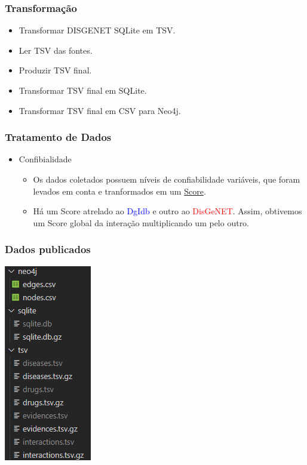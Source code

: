 \documentclass[12pt]{beamer}
\begin{document}
\begin{frame}[fragile]
  \frametitle{Transformação}

  \begin{itemize}
    \item Transformar DISGENET SQLite em TSV.
    \item Ler TSV das fontes.
    \item Produzir TSV final.
    \item Transformar TSV final em SQLite.
    \item Transformar TSV final em CSV para Neo4j.
  \end{itemize}
\end{frame}

\begin{frame}
  \frametitle{Tratamento de Dados}

  \begin{itemize}
    \item Confibialidade
          \begin{itemize}
            \item Os dados coletados possuem níveis de confiabilidade
                  variáveis, que foram levados em conta e tranformados em um \underline{Score}.
            \item Há um Score atrelado ao \textcolor{blue}{DgIdb} e outro ao \textcolor{red}{DisGeNET}. Assim, obtivemos um Score global da interação multiplicando um pelo outro.      
          \end{itemize}
  \end{itemize}
\end{frame}

\begin{frame}
  \frametitle{Dados publicados}

  \centering
  \includegraphics[scale=0.7]{ls}
\end{frame}
\end{document}
